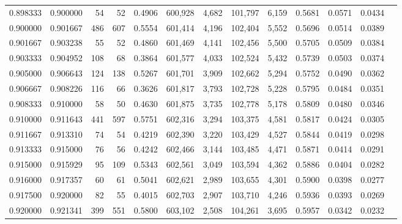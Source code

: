 \begin{tabular}{rrrrrrrrrrrrr}
0.898333 & 0.900000 &    54 &  52 &                                     0.4906 & 600,928 &   4,682 & 101,797 &   6,159 & 0.5681 & 0.0571 & 0.0434 \\
0.900000 & 0.901667 &   486 & 607 &                                     0.5554 & 601,414 &   4,196 & 102,404 &   5,552 & 0.5696 & 0.0514 & 0.0389 \\
0.901667 & 0.903238 &    55 &  52 &                                     0.4860 & 601,469 &   4,141 & 102,456 &   5,500 & 0.5705 & 0.0509 & 0.0384 \\
0.903333 & 0.904952 &   108 &  68 &                                     0.3864 & 601,577 &   4,033 & 102,524 &   5,432 & 0.5739 & 0.0503 & 0.0374 \\
0.905000 & 0.906643 &   124 & 138 &                                     0.5267 & 601,701 &   3,909 & 102,662 &   5,294 & 0.5752 & 0.0490 & 0.0362 \\
0.906667 & 0.908226 &   116 &  66 &                                     0.3626 & 601,817 &   3,793 & 102,728 &   5,228 & 0.5795 & 0.0484 & 0.0351 \\
0.908333 & 0.910000 &    58 &  50 &                                     0.4630 & 601,875 &   3,735 & 102,778 &   5,178 & 0.5809 & 0.0480 & 0.0346 \\
0.910000 & 0.911643 &   441 & 597 &                                     0.5751 & 602,316 &   3,294 & 103,375 &   4,581 & 0.5817 & 0.0424 & 0.0305 \\
0.911667 & 0.913310 &    74 &  54 &                                     0.4219 & 602,390 &   3,220 & 103,429 &   4,527 & 0.5844 & 0.0419 & 0.0298 \\
0.913333 & 0.915000 &    76 &  56 &                                     0.4242 & 602,466 &   3,144 & 103,485 &   4,471 & 0.5871 & 0.0414 & 0.0291 \\
0.915000 & 0.915929 &    95 & 109 &                                     0.5343 & 602,561 &   3,049 & 103,594 &   4,362 & 0.5886 & 0.0404 & 0.0282 \\
0.916000 & 0.917357 &    60 &  61 &                                     0.5041 & 602,621 &   2,989 & 103,655 &   4,301 & 0.5900 & 0.0398 & 0.0277 \\
0.917500 & 0.920000 &    82 &  55 &                                     0.4015 & 602,703 &   2,907 & 103,710 &   4,246 & 0.5936 & 0.0393 & 0.0269 \\
0.920000 & 0.921341 &   399 & 551 &                                     0.5800 & 603,102 &   2,508 & 104,261 &   3,695 & 0.5957 & 0.0342 & 0.0232 \\

\end{tabular}
